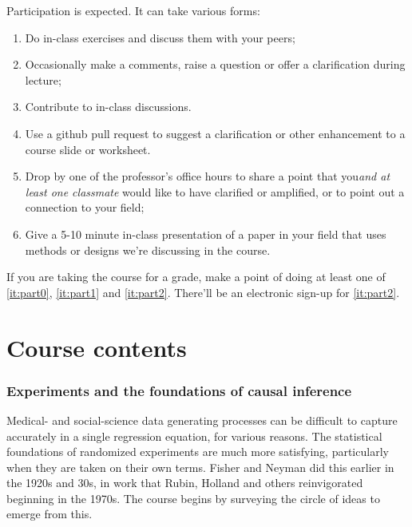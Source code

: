 \documentclass[12pt]{article}
\begin{document}
Participation is expected.  It can take various forms:
\begin{enumerate}
\item Do in-class exercises and discuss them with your peers;
\item Occasionally make a comments, raise a question or offer a clarification
  during lecture;
\item Contribute to in-class discussions.
\item \label{it:part0} Use a github pull request to suggest a clarification or other enhancement to
  a course slide or worksheet.
\item \label{it:part1} Drop by one of the professor's office hours to share a point
  that you\textit{and at least one classmate} would like to have clarified or
  amplified, or to point out a connection to your field; 
\item \label{it:part2} Give a 5-10 minute in-class presentation of a paper in your
  field that uses methods or designs we're discussing in the course.
\end{enumerate}
If you are taking the course for a grade, make a point of doing at
least one of \ref{it:part0}, \ref{it:part1} and \ref{it:part2}.  There'll be an
electronic sign-up for \ref{it:part2}.



\section{Course contents}

\subsubsection{Experiments and the foundations of causal inference}

Medical- and social-science data generating processes can be difficult to
capture accurately in a single regression equation, for various reasons.  
The statistical foundations of randomized experiments are much more
satisfying, particularly when they are taken on their own
terms. Fisher and Neyman did this earlier in the 1920s and 30s, in
work that Rubin, Holland and others reinvigorated beginning in the
1970s.  The course begins by surveying the circle of ideas to emerge
from this. 
\end{document}
